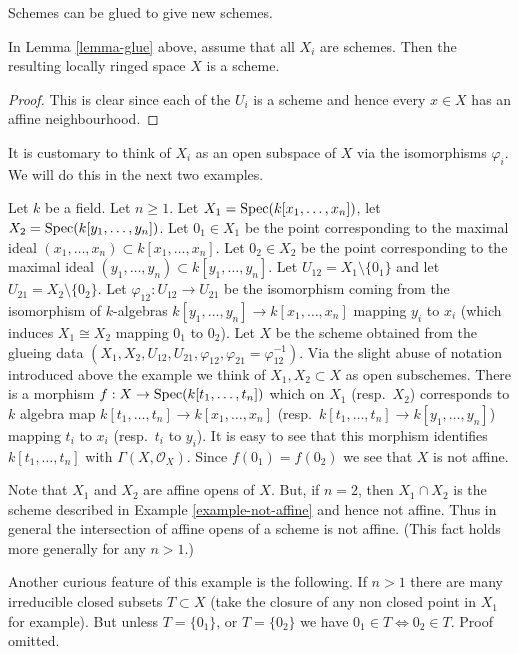 \begin{lemma}
\label{lemma-glue-schemes}
\begin{slogan}
Schemes can be glued to give new schemes.
\end{slogan}
In Lemma \ref{lemma-glue} above, assume that all
$X_i$ are schemes. Then the resulting locally ringed
space $X$ is a scheme.
\end{lemma}

\begin{proof}
This is clear since each of the $U_i$ is a scheme
and hence every $x \in X$ has an affine neighbourhood.
\end{proof}

\noindent
It is customary to think of $X_i$ as an open subspace of
$X$ via the isomorphisms $\varphi_i$. We will do this in
the next two examples.

\begin{example}
\label{example-affine-space-zero-doubled}
Let $k$ be a field. Let $n \geq 1$.
Let $X_1 = \mathop{\mathrm{Spec}}(k[x_1, \ldots, x_n])$,
let $X_2 = \mathop{\mathrm{Spec}}(k[y_1, \ldots, y_n])$.
Let $0_1 \in X_1$ be the point corresponding to the maximal ideal
$(x_1, \ldots, x_n) \subset k[x_1, \ldots, x_n]$.
Let $0_2 \in X_2$ be the point corresponding to the maximal ideal
$(y_1, \ldots, y_n) \subset k[y_1, \ldots, y_n]$.
Let $U_{12} = X_1 \setminus \{0_1\}$ and
let $U_{21} = X_2 \setminus \{0_2\}$. Let
$\varphi_{12} : U_{12} \to U_{21}$ be the isomorphism
coming from the isomorphism of $k$-algebras
$k[y_1, \ldots, y_n] \to k[x_1, \ldots, x_n]$
mapping $y_i$ to $x_i$ (which induces $X_1 \cong X_2$ mapping
$0_1$ to $0_2$).
Let $X$ be the scheme obtained from the glueing data
$(X_1, X_2, U_{12}, U_{21}, \varphi_{12},
\varphi_{21} = \varphi_{12}^{-1})$. Via the slight abuse
of notation introduced above the example we think of
$X_1, X_2 \subset X$ as open subschemes.
There is a morphism $f : X \to \mathop{\mathrm{Spec}}(k[t_1, \ldots, t_n])$
which on $X_1$ (resp.\ $X_2$) corresponds to $k$ algebra map
$k[t_1, \ldots, t_n] \to k[x_1, \ldots, x_n]$
(resp.\ $k[t_1, \ldots, t_n] \to k[y_1, \ldots, y_n]$)
mapping $t_i$ to $x_i$ (resp.\  $t_i$ to $y_i$).
It is easy to see that this morphism identifies
$k[t_1, \ldots, t_n]$ with $\Gamma(X, \mathcal{O}_X)$. Since
$f(0_1) = f(0_2)$ we see that $X$ is not affine.

\medskip\noindent
Note that $X_1$ and $X_2$ are affine opens of $X$.
But, if $n = 2$, then $X_1 \cap X_2$ is the scheme
described in Example \ref{example-not-affine} and hence not affine.
Thus in general the intersection of affine opens of a scheme
is not affine. (This fact holds more generally for any $n > 1$.)

\medskip\noindent
Another curious feature of this example is the following.
If $n > 1$ there are many irreducible closed subsets $T \subset X$
(take the closure of any non closed point in $X_1$ for example).
But unless $T = \{0_1\}$, or $T = \{0_2\}$ we have
$0_1 \in T \Leftrightarrow 0_2 \in T$. Proof omitted.
\end{example}

